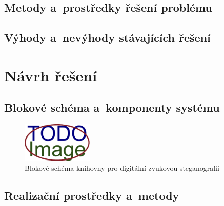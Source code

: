 
\blindtext

\subsection*{Metody a~prostředky řešení problému}
\label{sub:problem-solution}


\blindtext

\subsection*{Výhody a~nevýhody stávajících řešení}
\label{sub:pros-cons-existing-solutions}


\blindtext

\section{Návrh řešení}
\label{sec:solution-proposal}


\blindtext

\subsection*{Blokové schéma a~komponenty systému}
\label{sub:solution-components}


\blindtext

\begin{figure}[hbt]
    \centering
    \includegraphics[width=0.3\textwidth]{obrazky/placeholder.pdf}
    \caption{Blokové schéma knihovny pro digitální zvukovou steganografii}
    \label{pic:library-block-diagram}
\end{figure}

\blindtext

\subsection*{Realizační prostředky a~metody}
\label{sub:actual-problem-solution}

